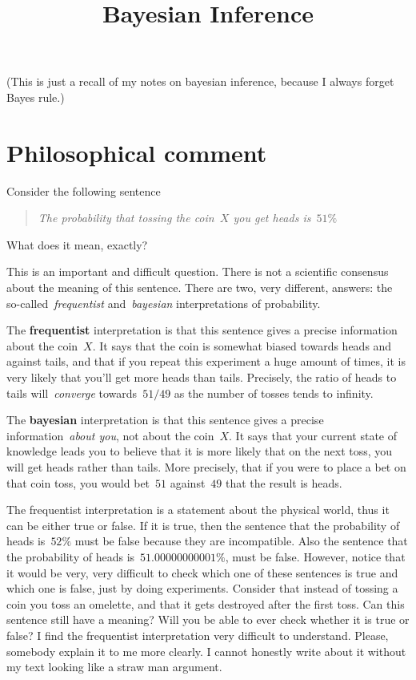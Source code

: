 \title{Bayesian Inference}

(This is just a recall of my notes on bayesian inference, because I always
forget Bayes rule.)

\section{Philosophical comment}

Consider the following sentence

\begin{quote}
\emph{The probability that tossing the coin~$X$ you get heads is~$51\%$}
\end{quote}

What does it mean, exactly?

This is an important and difficult question.  There is not a scientific
consensus about the meaning of this sentence.  There are two, very different,
answers: the so-called~\emph{frequentist} and~\emph{bayesian} interpretations
of probability.

The {\bf frequentist} interpretation is that this sentence gives a precise
information about the coin~$X$.  It says that the coin is somewhat biased
towards heads and against tails, and that if you repeat this experiment a
huge amount of times, it is very likely that you'll get more heads than
tails.  Precisely, the ratio of heads to tails will~\emph{converge}
towards~$51/49$ as the number of tosses tends to infinity.

The {\bf bayesian} interpretation is that this sentence gives a precise
information~\emph{about you}, not about the coin~$X$.  It says that your
current state of knowledge leads you to believe that it is more likely that
on the next toss, you will get heads rather than tails.  More precisely, that
if you were to place a bet on that coin toss, you would bet~$51$ against~$49$
that the result is heads.

The frequentist interpretation is a statement about the physical world, thus
it can be either true or false.  If it is true, then the sentence that the
probability of heads is~$52\%$ must be false because they are incompatible.
Also the sentence that the probability of heads is~$51.00000000001\%$, must
be false.  However, notice that it would be very, very difficult to check
which one of these sentences is true and which one is false, just by doing
experiments.  Consider that instead of tossing a coin you toss an omelette,
and that it gets destroyed after the first toss.  Can this sentence still
have a meaning?  Will you be able to ever check whether it is true or false?
I find the frequentist interpretation very difficult to understand.  Please,
somebody explain it to me more clearly.  I cannot honestly write about it
without my text looking like a straw man argument.

